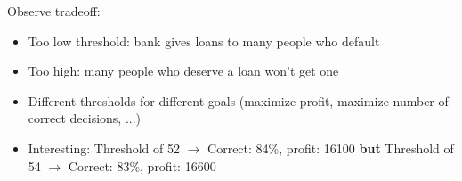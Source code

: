 \documentclass[12pt,a4paper]{article}
\begin{document}
\begin{description}
\item Observe tradeoff: 
\begin{itemize}
\item Too low threshold: bank gives loans to many people who default
\item Too high: many people who deserve a loan won't get one
\end{itemize}
\end{description}
\begin{itemize}
\item Different thresholds for different goals (maximize profit, maximize number of correct decisions, ...)
\item Interesting: Threshold of 52 \(\rightarrow\) Correct: 84\%, profit: 16100 \textbf{but} Threshold of 54 \(\rightarrow\) Correct: 83\%, profit: 16600
\end{itemize}
\end{document}
